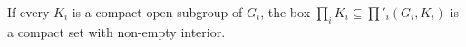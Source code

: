 If every $K_i$ is a compact open subgroup of $G_i$, the box $\prod_iK_i\subseteq\prod'_i(G_i,K_i)$ is a compact set with non-empty interior.
